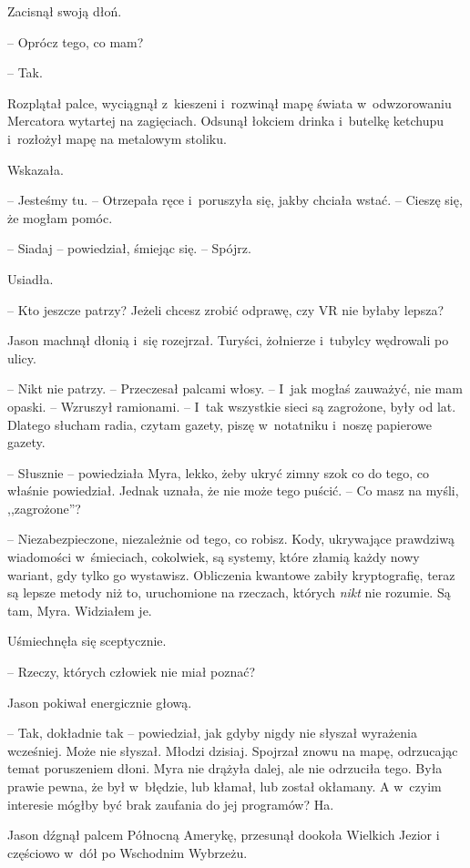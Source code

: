 \documentclass[oneside,polish,11pt,sfheadings]{mwbk}
\begin{document}
Zacisnął swoją dłoń.

-- Oprócz tego, co mam?

-- Tak.

Rozplątał palce, wyciągnął z~kieszeni i~rozwinął mapę świata w~odwzorowaniu Mercatora wytartej na zagięciach. Odsunął łokciem drinka i~butelkę ketchupu i~rozłożył mapę na metalowym stoliku.

Wskazała. 

-- Jesteśmy tu. -- Otrzepała ręce i~poruszyła się, jakby chciała
wstać. -- Cieszę się, że mogłam pomóc.

-- Siadaj -- powiedział, śmiejąc się. -- Spójrz.

Usiadła. 

-- Kto jeszcze patrzy? Jeżeli chcesz zrobić odprawę, czy VR nie
byłaby lepsza?

Jason machnął dłonią i~się rozejrzał. Turyści, żołnierze i~tubylcy
wędrowali po ulicy. 

-- Nikt nie patrzy. -- Przeczesał palcami włosy. -- I~jak mogłaś zauważyć, nie mam opaski. -- Wzruszył ramionami. -- I~tak
wszystkie sieci są zagrożone, były od lat. Dlatego słucham radia, czytam
gazety, piszę w~notatniku i~noszę papierowe gazety.

-- Słusznie -- powiedziała Myra, lekko, żeby ukryć zimny szok co do tego,
co właśnie powiedział. Jednak uznała, że nie może tego puścić. -- Co masz
na myśli, ,,zagrożone''?

-- Niezabezpieczone, niezależnie od tego, co robisz. Kody, ukrywające
prawdziwą wiadomości w~śmieciach, cokolwiek, są systemy, które złamią
każdy nowy wariant, gdy tylko go wystawisz. Obliczenia kwantowe zabiły
kryptografię, teraz są lepsze metody niż to, uruchomione na rzeczach,
których \textit{nikt} nie rozumie. Są tam, Myra. Widziałem je.

Uśmiechnęła się sceptycznie. 

-- Rzeczy, których człowiek nie miał
poznać? 

Jason pokiwał energicznie głową. 

-- Tak, dokładnie tak -- powiedział, jak
gdyby nigdy nie słyszał wyrażenia wcześniej. Może nie słyszał. Młodzi
dzisiaj. Spojrzał znowu na mapę, odrzucając temat poruszeniem dłoni.
Myra nie drążyła dalej, ale nie odrzuciła tego. Była prawie pewna, że
był w~błędzie, lub kłamał, lub został okłamany. A w~czyim interesie
mógłby być brak zaufania do jej programów? Ha.

Jason dźgnął palcem Północną Amerykę, przesunął dookoła Wielkich Jezior
i częściowo w~dół po Wschodnim Wybrzeżu. 
\end{document}
